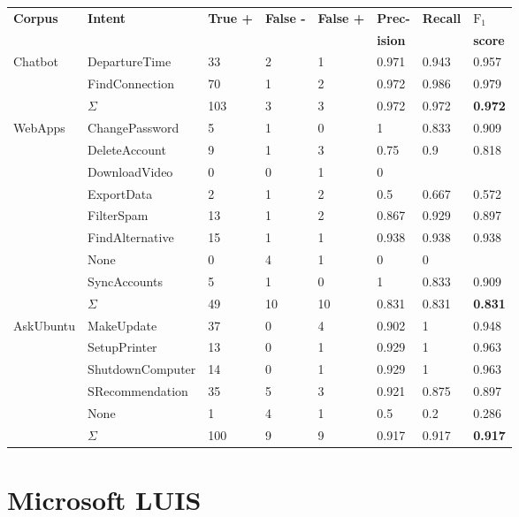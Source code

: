 \begin{center}
    \begin{tabular}{l l l l l l l l}
        \textbf{Corpus} & \textbf{Intent} & \textbf{True +} & \textbf{False -} & \textbf{False +} & \textbf{Prec-} & \textbf{Recall} & \textbf{$\text{F}_1$}\\
        & & & & & \textbf{ision} & & \textbf{score} \\
        \hline
        \multirow{3}{*}{Chatbot} & DepartureTime & 33 & 2 & 1 & 0.971 & 0.943 & 0.957 \\
        & FindConnection & 70 & 1 & 2 & 0.972 & 0.986 & 0.979 \\
        & $\Sigma$ & 103 & 3 & 3 & 0.972 & 0.972 & \textbf{0.972} \\
        \hline
        \multirow{9}{*}{WebApps} & ChangePassword & 5 & 1 & 0 & 1 & 0.833 & 0.909 \\
        & DeleteAccount & 9 & 1 & 3 & 0.75 & 0.9 & 0.818 \\
        & DownloadVideo & 0 & 0 & 1 & 0 & &  \\
        & ExportData & 2 & 1 & 2 & 0.5 & 0.667 & 0.572 \\
        & FilterSpam & 13 & 1 & 2 & 0.867 & 0.929 & 0.897 \\
        & FindAlternative & 15 & 1 & 1 & 0.938 & 0.938 & 0.938 \\
        & None & 0 & 4 & 1 & 0 & 0 &  \\
        & SyncAccounts & 5 & 1 & 0 & 1 & 0.833 & 0.909 \\
        & $\Sigma$ & 49 & 10 & 10 & 0.831 & 0.831 & \textbf{0.831} \\
        \hline
        \multirow{6}{*}{AskUbuntu} & MakeUpdate & 37 & 0 & 4 & 0.902 & 1 & 0.948 \\
        & SetupPrinter & 13 & 0 & 1 & 0.929 & 1 & 0.963 \\
        & ShutdownComputer & 14 & 0 & 1 & 0.929 & 1 & 0.963 \\
        & SRecommendation & 35 & 5 & 3 & 0.921 & 0.875 & 0.897\\
        & None & 1 & 4 & 1 & 0.5 & 0.2 & 0.286 \\
        & $\Sigma$ & 100 & 9 & 9 & 0.917 & 0.917 & \textbf{0.917}\\
        \hline
    \end{tabular}
\end{center}

\section{Microsoft LUIS}
\label{sec:recalculations_luis}
\vspace*{1cm}


